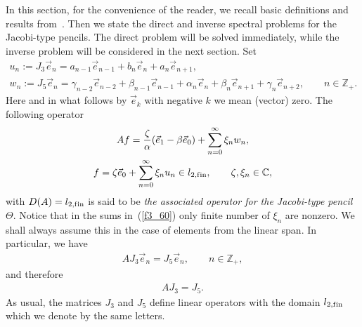 \documentclass[11pt]{article}
\numberwithin{equation}{section}
\begin{document}
In this section, for the convenience of the reader, we recall basic def\/initions and results from~\cite{cit_95000_Z}. Then we state the direct and inverse spectral problems for the Jacobi-type pencils. The direct problem will be solved immediately, while the inverse problem will be considered in the next section. Set
\begin{gather*}
u_n := J_3 \vec e_n = a_{n-1} \vec e_{n-1} + b_n \vec e_n + a_n \vec e_{n+1}, \\
w_n := J_5 \vec e_n = \gamma_{n-2} \vec e_{n-2} + \beta_{n-1} \vec e_{n-1} + \alpha_n \vec e_n + \beta_n \vec e_{n+1}+ \gamma_n \vec e_{n+2},\qquad n\in\mathbb{Z}_+.
\end{gather*}
Here and in what follows by $\vec e_k$ with negative $k$ we mean (vector) zero. The following operator
\begin{gather} A f = \frac{\zeta}{\alpha} (\vec e_1 - \beta \vec e_0) + \sum_{n=0}^\infty \xi_n w_n, \notag \\
f = \zeta \vec e_0 + \sum_{n=0}^\infty \xi_n u_n\in l_{2,{\rm f\/in}},\qquad \zeta, \xi_n\in\mathbb{C}, \label{f3_60}
\end{gather}
with $D(A) = l_{2,{\rm f\/in}}$ is said to be \textit{the associated operator for the Jacobi-type pencil $\Theta$}. Notice that in the sums in~(\ref{f3_60}) only f\/inite number of $\xi_n$ are nonzero. We shall always assume this in the case of elements from the linear span. In particular, we have
\begin{gather*} A J_3 \vec e_n = J_5 \vec e_n,\qquad n\in\mathbb{Z}_+, \end{gather*}
and therefore
\begin{gather*} A J_3 = J_5. \end{gather*}
As usual, the matrices $J_3$ and $J_5$ def\/ine linear operators with the domain $l_{2,{\rm f\/in}}$ which we denote by the same letters.
\end{document}
